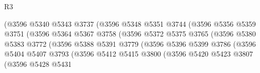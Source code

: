 \begin{lexlean}{R3}
\begin{coremodule}
                                      (@3596
                                        @5340
                                        @5343
                                        @3737
                                        (@3596
                                          @5348
                                          @5351
                                          @3744
                                          (@3596
                                            @5356
                                            @5359
                                            @3751
                                            (@3596
                                              @5364
                                              @5367
                                              @3758
                                              (@3596
                                                @5372
                                                @5375
                                                @3765
                                                (@3596
                                                  @5380
                                                  @5383
                                                  @3772
                                                  (@3596
                                                    @5388
                                                    @5391
                                                    @3779
                                                    (@3596
                                                      @5396
                                                      @5399
                                                      @3786
                                                      (@3596
                                                        @5404
                                                        @5407
                                                        @3793
                                                        (@3596
                                                          @5412
                                                          @5415
                                                          @3800
                                                          (@3596
                                                            @5420
                                                            @5423
                                                            @3807
                                                            (@3596
                                                              @5428
                                                              @5431

\end{coremodule}
\end{lexlean}

